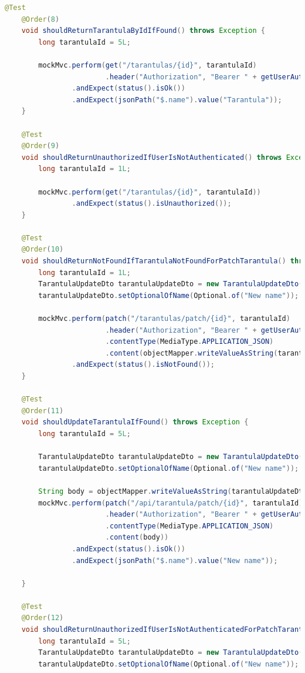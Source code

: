 \documentclass[a4paper,12pt,oneside]{article}
\begin{document}
\begin{lstlisting}[language=Java]
    @Test
    @Order(8)
    void shouldReturnTarantulaByIdIfFound() throws Exception {
        long tarantulaId = 5L;

        mockMvc.perform(get("/tarantulas/{id}", tarantulaId)
                        .header("Authorization", "Bearer " + getUserAuthToken()))
                .andExpect(status().isOk())
                .andExpect(jsonPath("$.name").value("Tarantula"));
    }

    @Test
    @Order(9)
    void shouldReturnUnauthorizedIfUserIsNotAuthenticated() throws Exception {
        long tarantulaId = 1L;

        mockMvc.perform(get("/tarantulas/{id}", tarantulaId))
                .andExpect(status().isUnauthorized());
    }

    @Test
    @Order(10)
    void shouldReturnNotFoundIfTarantulaNotFoundForPatchTarantula() throws Exception {
        long tarantulaId = 1L;
        TarantulaUpdateDto tarantulaUpdateDto = new TarantulaUpdateDto();
        tarantulaUpdateDto.setOptionalOfName(Optional.of("New name"));

        mockMvc.perform(patch("/tarantulas/patch/{id}", tarantulaId)
                        .header("Authorization", "Bearer " + getUserAuthToken())
                        .contentType(MediaType.APPLICATION_JSON)
                        .content(objectMapper.writeValueAsString(tarantulaUpdateDto)))
                .andExpect(status().isNotFound());
    }

    @Test
    @Order(11)
    void shouldUpdateTarantulaIfFound() throws Exception {
        long tarantulaId = 5L;

        TarantulaUpdateDto tarantulaUpdateDto = new TarantulaUpdateDto();
        tarantulaUpdateDto.setOptionalOfName(Optional.of("New name"));

        String body = objectMapper.writeValueAsString(tarantulaUpdateDto);
        mockMvc.perform(patch("/api/tarantula/patch/{id}", tarantulaId)
                        .header("Authorization", "Bearer " + getUserAuthToken())
                        .contentType(MediaType.APPLICATION_JSON)
                        .content(body))
                .andExpect(status().isOk())
                .andExpect(jsonPath("$.name").value("New name"));

    }

    @Test
    @Order(12)
    void shouldReturnUnauthorizedIfUserIsNotAuthenticatedForPatchTarantula() throws Exception {
        long tarantulaId = 5L;
        TarantulaUpdateDto tarantulaUpdateDto = new TarantulaUpdateDto();
        tarantulaUpdateDto.setOptionalOfName(Optional.of("New name"));


\end{lstlisting}
\end{document}

